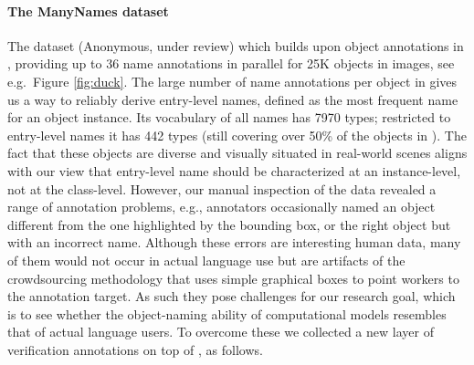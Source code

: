 \paragraph{The ManyNames dataset}
The \mn dataset (Anonymous, under review) which builds upon object annotations in \vg, providing up to 36 name annotations in parallel for 25K objects in images, see e.g.\ Figure \ref{fig:duck}.
The large number of name annotations per object in \mn gives us a way to reliably derive entry-level names, defined as the most frequent name for an object instance.
Its vocabulary of all names has 7970 types; restricted to entry-level names it has 442 types (still covering over 50\% of the objects in \vg).
The fact that these objects are diverse and visually situated in real-world scenes aligns with our view that entry-level name should be characterized at an instance-level, not at the class-level.
However, our manual inspection of the \mn data revealed a range of annotation problems, e.g., annotators occasionally named an object different from the one highlighted by the bounding box, or the right object but with an incorrect name.
Although these errors are interesting human data, many of them would not occur in actual language use but are artifacts of the crowdsourcing methodology that uses simple graphical boxes to point workers to the annotation target.
As such they pose challenges for our research goal, which is to see whether the object-naming ability of computational models resembles that of actual language users.
To overcome these we collected a new layer of verification annotations on top of \mn, as follows.

